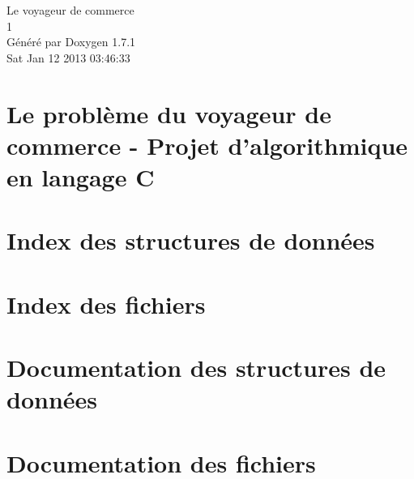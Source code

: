 \documentclass[a4paper]{book}
\begin{document}
\hypersetup{pageanchor=false}
\begin{titlepage}
\vspace*{7cm}
\begin{center}
{\Large Le voyageur de commerce \\[1ex]\large 1 }\\
\vspace*{1cm}
{\large Généré par Doxygen 1.7.1}\\
\vspace*{0.5cm}
{\small Sat Jan 12 2013 03:46:33}\\
\end{center}
\end{titlepage}
\clearemptydoublepage
{}
\tableofcontents
\clearemptydoublepage
{}
\hypersetup{pageanchor=true}
\chapter{Le problème du voyageur de commerce -\/ Projet d'algorithmique en langage C}
\label{index}\hypertarget{index}{}
\chapter{Index des structures de données}

\chapter{Index des fichiers}

\chapter{Documentation des structures de données}








\chapter{Documentation des fichiers}






















\printindex
\end{document}

